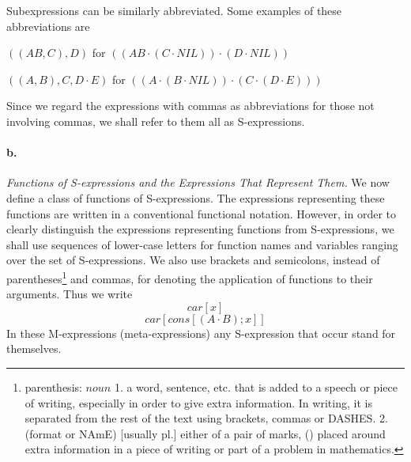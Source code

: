 \documentclass[11pt, a4paper]{article}
\begin{document}
Subexpressions can be similarly abbreviated. Some examples of these
abbreviations are
\begin{center}
  $((AB, C), D)$ for $((AB \cdot (C \cdot NIL)) \cdot (D \cdot NIL))$
\end{center}
\begin{center}
  $((A, B), C, D \cdot E)$ for
  $((A \cdot (B \cdot NIL)) \cdot (C \cdot (D \cdot E)))$
\end{center}

Since we regard the expressions with commas as abbreviations for those not
involving commas, we shall refer to them all as S-expressions.

\paragraph{b.}\textit{Functions of S-expressions and the Expressions That
  Represent Them.}
We now define a class of functions of S-expressions. The expressions
representing these functions are written in a conventional functional
notation. However, in order to clearly distinguish the expressions representing
functions from S-expressions, we shall use sequences of lower-case letters for
function names and variables ranging over the set of S-expressions. We also use
brackets and semicolons, instead of
parentheses\footnote{parenthesis: $noun$ 1. a word, sentence, etc. that is added
  to a speech or piece of writing, especially in order to give extra
  information. In writing, it is separated from the rest of the text using
  brackets, commas or DASHES. 2. (format or NAmE) [usually pl.] either of a pair
  of marks, () placed around extra information in a piece of writing or part of
  a problem in mathematics.}
and commas, for denoting the
application of functions to their arguments. Thus we write
$$ car[x] $$
$$ car[cons[(A \cdot B); x]] $$
In these M-expressions (meta-expressions) any S-expression that occur stand for
themselves.
\end{document}
